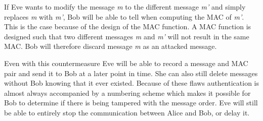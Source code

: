 If Eve wants to modify the message \emph{m} to the different message \emph{m'} and simply replaces \emph{m} with \emph{m'}, Bob will be able to tell when computing the MAC of \emph{m'}.
This is the case because of the design of the MAC function.
A MAC function is designed such that two different messages \emph{m} and \emph{m'} will not result in the same MAC.
Bob will therefore discard message \emph{m} as an attacked message.

Even with this countermeasure Eve will be able to record a message and MAC pair and send it to Bob at a later point in time.
She can also still delete messages without Bob knowing that it ever existed.
Because of these flaws authentication is almost always accompanied by a numbering scheme which makes it possible for Bob to determine if there is being tampered with the message order.
Eve will still be able to entirely stop the communication between Alice and Bob, or delay it.

